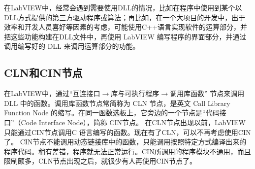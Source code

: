 在LabVIEW中，经常会遇到需要使用DLL的情况，比如在程序中使用到某个以DLL方式提供的第三方驱动程序或算法；再比如，在一个大项目的开发中，出于效率和开发人员喜好等因素的考虑，可能使用C++语言实现软件的运算部分，并把这些功能构建在DLL文件中，再使用 LabVIEW 编写程序的界面部分，并通过调用编写好的 DLL 来调用运算部分的功能。


\subsection{CLN和CIN节点}
在LabVIEW中，通过“互连接口$\rightarrow$库与可执行程序$\rightarrow$调用库函数” 节点来调用 DLL 中的函数。调用库函数节点常简称为 CLN 节点，是英文 Call Library Function Node 的缩写。在同一函数选板上，它旁边的一个节点是“代码接口”（Code Interface Node），简称 CIN节点。
在CLN节点出现以前，LabVIEW只能通过CIN节点调用C 语言编写的函数。现在有了CLN，可以不再考虑使用CIN了。
CIN节点不能调用动态链接库中的函数，只能调用按照特定方式编译出来的程序代码。稍有差错，程序就无法正常运行。CIN所调用的程序模块不通用，而且限制颇多，CLN节点出现之后，就很少有人再使用CIN节点了。


